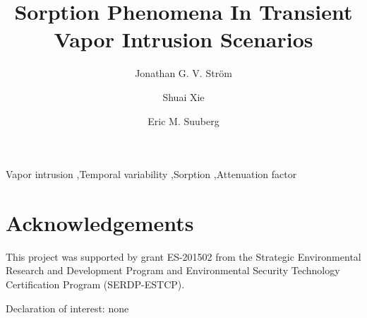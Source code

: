 \documentclass[preprint,12pt]{elsarticle}
\begin{document}
\begin{frontmatter}
\title{Sorption Phenomena In Transient Vapor Intrusion Scenarios}

\author[Brown]{Jonathan G. V. Ström}
\author[Brown]{Shuai Xie}
\author[Brown]{Eric M. Suuberg}


\address{These authors contributed equally to this work}
\address[Brown]{Brown University, School of Engineering, Providence, RI, USA}

\begin{abstract}

\end{abstract}

\begin{keyword}
  Vapor intrusion \sep Temporal variability \sep Sorption \sep Attenuation factor
\end{keyword}

\end{frontmatter}






\section*{Acknowledgements}
This project was supported by grant ES-201502 from the Strategic Environmental Research and Development Program and Environmental Security Technology Certification Program (SERDP-ESTCP).\par

Declaration of interest: none




\begin{comment}
Main point of this paper:

To explore how sorption affects VI transport in soils and indoor environment,
and the effect that sorption has on efficacy of mitigation systems

Outline:

Introduction:
* Why study sorption in VI?
- Many materials (significantly) sorb VI contaminants.
- No previous studies.
- May significantly affect:
-- Mitigation
-- VI investigations

* What are we gonna do to bridge till gap?
- Measure sorptive capacities at relevant concentrations. Why?
-- Isotherms non-linear w.r.t. concentration & few studies at VI relevant conditions.
-- Pick TCE (contaminant of significant concern).
- Apply results in our VI model.
-- Used extensively before
-- In lieu of a study house this will give some insights

* Outline
- Experimental setup
- Numerical model & governing equations
- Results regarding:
-- Soil transport & sorption
-- Indoor environment transport & sorption (specifically how response of c_in w.r.t. pressurization changes).
-- Reduction of mitigation system efficacy




\end{comment}
\end{document}
